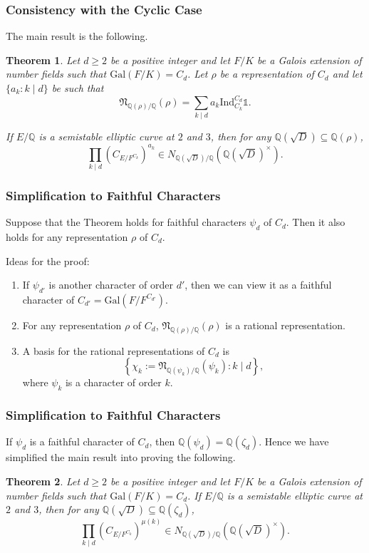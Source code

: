 \documentclass{beamer}
\newcommand{\Gal}{\mathrm{Gal}}
\newcommand{\Ind}{\mathrm{Ind}}
\newcommand{\QQ}{\mathbb{Q}}
\newcommand{\bQ}{\mathbb{Q}}
\newcommand{\fN}{\mathfrak{N}}
\newcommand{\repnorm}[1]{\fN_{\bQ(#1) / \bQ}(#1)}
\theoremstyle{plain}
\newtheorem{thm}{Theorem}[section]
\begin{document}
\begin{frame}
    \frametitle{Consistency with the Cyclic Case}
    The main result is the following.
    \begin{thm}
        Let $d\geq2$ be a positive integer and let $F/K$ be a Galois extension of number fields such that $\Gal(F/K)=C_d$. Let $\rho$ be a representation of $C_d$ and let $\{a_k:k\mid d\}$ be such that $$\repnorm{\rho}=\sum_{k\mid d}a_k\Ind_{C_k}^{C_d}\mathds{1}.$$
    
        \pause If $E/\QQ$ is a semistable elliptic curve at $2$ and $3$, then for any $\QQ(\sqrt{D})\subseteq\QQ(\rho)$,
        $$\prod_{k\mid d}(C_{E/F^{C_k}})^{a_k}\in N_{\QQ(\sqrt{D})/\QQ}(\QQ(\sqrt{D})^{\times}).$$
    \end{thm}

\end{frame}


\begin{frame}
    \frametitle{Simplification to Faithful Characters}

    \begin{lemma}
        Suppose that the Theorem holds for faithful characters $\psi_d$ of $C_d$. Then it also holds for any representation $\rho$ of $C_d$.
    \end{lemma} \pause

    Ideas for the proof:
    \begin{enumerate}
        \item If $\psi_{d'}$ is another character of order $d'$, then we can view it as a faithful character of $C_{d'}=\Gal(F/F^{C_{d'}})$. \pause
        \item For any representation $\rho$ of $C_d$, $\repnorm{\rho}$ is a rational representation. \pause
        \item A basis for the rational representations of $C_d$ is 
        $$\left\{\chi_k:=\repnorm{\psi_k}:k\mid d\right\},$$
        where $\psi_k$ is a character of order $k$.
    \end{enumerate}

\end{frame}

\begin{frame}
    \frametitle{Simplification to Faithful Characters}
    If $\psi_d$ is a faithful character of $C_d$, then $\QQ(\psi_d)=\QQ(\zeta_d)$. Hence we have simplified the main result into proving the following. \pause
    \begin{thm}
        Let $d\geq2$ be a positive integer and let $F/K$ be a Galois extension of number fields such that $\Gal(F/K)=C_d$. If $E/\QQ$ is a semistable elliptic curve at $2$ and $3$, then for any $\QQ(\sqrt{D})\subseteq\QQ(\zeta_d)$,
        $$\prod_{k\mid d}(C_{E/F^{C_k}})^{\mu(k)}\in N_{\QQ(\sqrt{D})/\QQ}(\QQ(\sqrt{D})^{\times}).$$
    \end{thm}
\end{frame}
\end{document}
